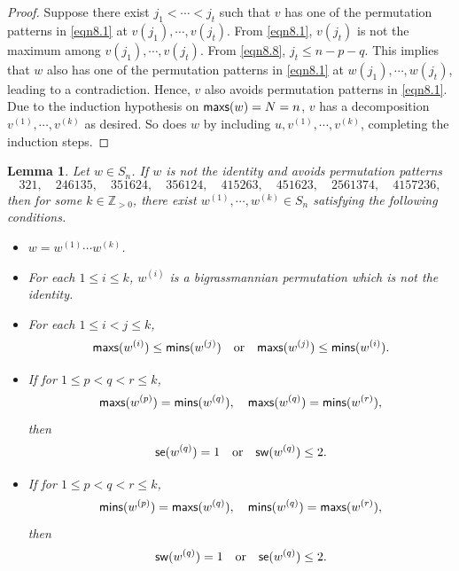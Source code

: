 \documentclass[12pt]{amsart}
\newtheorem{lemma}[theorem]{Lemma}
\theoremstyle{definition}
\theoremstyle{remark}
\newcommand{\Z}{\mathbb{Z}}
\begin{document}
\begin{proof}
Suppose there exist $j_1 < \cdots < j_t$ such that $v$ has one of the permutation patterns in \eqref{eqn8.1} at $v(j_1) , \cdots , v(j_t)$. From \eqref{eqn8.1}, $v(j_t)$ is not the maximum among $v(j_1) , \cdots , v(j_t)$. From \eqref{eqn8.8}, $j_t \leq n-p-q$. This implies that $w$ also has one of the permutation patterns in \eqref{eqn8.1} at $w(j_1) , \cdots , w(j_t)$, leading to a contradiction. Hence, $v$ also avoids permutation patterns in \eqref{eqn8.1}. Due to the induction hypothesis on ${\sf maxs}(w) = N = n$, $v$ has a decomposition $v^{(1)} , \cdots , v^{(k)}$ as desired. So does $w$ by including $u, v^{(1)} , \cdots , v^{(k)} $, completing the induction steps.
\end{proof}

\begin{lemma}\label{lem4.11}
Let $w \in S_n$. If $w$ is not the identity and avoids permutation patterns
\begin{equation}
321, \quad 246135, \quad 351624, \quad 356124, \quad 415263, \quad 451623, \quad 2561374, \quad 4157236,
\end{equation}
then for some $k \in \Z_{> 0}$, there exist $w^{(1)} , \cdots , w^{(k)} \in S_n$ satisfying the following conditions.
\begin{itemize}
\item $w = w^{(1)}  \cdots  w^{(k)}$.
\item For each $1 \leq i \leq k$, $w^{(i)}$ is a bigrassmannian permutation which is not the identity.
\item For each $1 \leq i < j \leq k$,
\begin{equation}
{\sf maxs}(w^{(i)}) \leq {\sf mins}(w^{(j)}) \quad \text{or} \quad {\sf maxs}(w^{(j)}) \leq {\sf mins}(w^{(i)}).
\end{equation}
\item If for $1 \leq p < q < r \leq k$,
\begin{equation}
{\sf maxs}(w^{(p)}) = {\sf mins}(w^{(q)}) , \quad {\sf maxs}(w^{(q)}) = {\sf mins}(w^{(r)}),
\end{equation}
then
\begin{equation}
{\sf se}(w^{(q)}) = 1 \quad \text{or} \quad {\sf sw}(w^{(q)}) \leq 2.
\end{equation}
\item If for $1 \leq p < q < r \leq k$,
\begin{equation}
{\sf mins}(w^{(p)}) = {\sf maxs}(w^{(q)}) , \quad {\sf mins}(w^{(q)}) = {\sf maxs}(w^{(r)}),
\end{equation}
then
\begin{equation}
{\sf sw}(w^{(q)}) = 1 \quad \text{or} \quad {\sf se}(w^{(q)}) \leq 2.
\end{equation}
\end{itemize}
\end{lemma}
\end{document}
